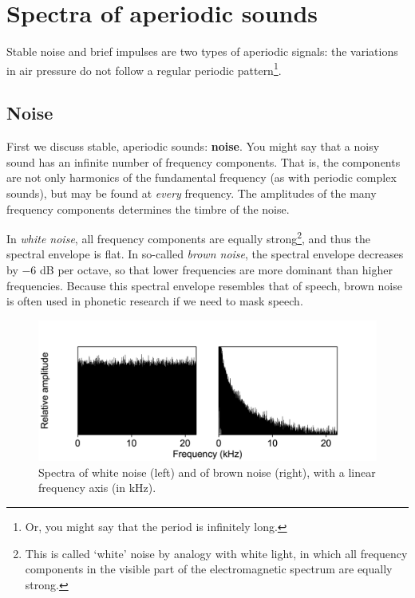 \documentclass[
]{book}
\begin{document}
\section{Spectra of aperiodic sounds}\label{spectra-of-aperiodic-sounds}

Stable noise and brief impulses are two types of aperiodic signals: the variations in air pressure do not follow a regular periodic pattern\footnote{Or, you might say that the period is infinitely long.}.

\subsection{Noise}\label{noise}

First we discuss stable, aperiodic sounds: \textbf{noise}. You might say that a noisy sound has an infinite number of frequency components. That is, the components are not only harmonics of the fundamental frequency (as with periodic complex sounds), but may be found at \emph{every} frequency. The amplitudes of the many frequency components determines the timbre of the noise.

In \emph{white noise}, all frequency components are equally strong\footnote{This is called `white' noise by analogy with white light, in which all frequency components in the visible part of the electromagnetic spectrum are equally strong.}, and thus the spectral envelope is flat.
In so-called \emph{brown noise}, the spectral envelope decreases by \(-6\) dB per octave, so that lower frequencies are more dominant than higher frequencies. Because this spectral envelope resembles that of speech, brown noise is often used in phonetic research if we need to mask speech.

\begin{figure}

{\centering \includegraphics{figures/whitebrownnoises} 

}

\caption{Spectra of white noise (left) and of brown noise (right), with a linear frequency axis (in kHz).}\label{fig:spectrum-whitebrownnoises}
\end{figure}
\end{document}
